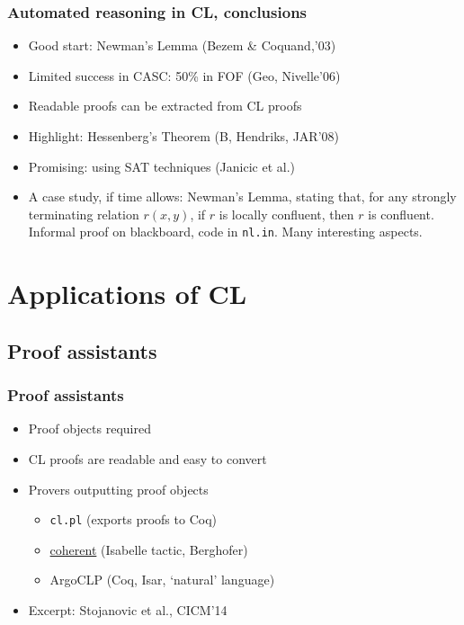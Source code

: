 \documentclass[handout,11pt]{beamer}
\begin{document}
\begin{frame}
\frametitle{Automated reasoning in CL, conclusions}
 \begin{itemize}[<+->]
   \item Good start: Newman's Lemma (Bezem \& Coquand,'03)
   \item Limited success in CASC: 50\% in FOF (Geo, Nivelle'06)
   \item Readable proofs can be extracted from CL proofs
   \item Highlight: Hessenberg's Theorem (B, Hendriks, JAR'08)
   \item Promising: using SAT techniques (Janicic et al.)
   \item A case study, if time allows: Newman's Lemma, stating
   that, for any strongly terminating relation $r(x,y)$, if
   $r$ is locally confluent, then $r$ is confluent.
   Informal proof on blackboard, code in \texttt{nl.in}.
   Many interesting aspects.
 \end{itemize}
\end{frame}


\section{Applications of CL}

\subsection{Proof assistants}

\begin{frame}
\frametitle{Proof assistants}
 \begin{itemize}[<+->]   %
    \item Proof objects \alert{required}
    \item CL proofs are readable and easy to convert
    \item Provers outputting proof objects
    \begin{itemize}
       \item \texttt{cl.pl} (exports proofs to Coq)
       \item \url{coherent} (Isabelle tactic, Berghofer)
       \item ArgoCLP (Coq, Isar, `natural' language)
    \end{itemize}
    \item %
                Excerpt: Stojanovic et al., CICM'14
                \href{run:/usr/bin/evince}{}
 \end{itemize}
\end{frame}
\end{document}
